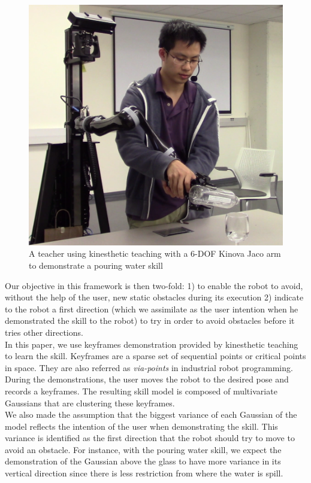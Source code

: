 \documentclass[letterpaper, 10 pt, conference]{ieeeconf}  %
\begin{document}
\begin{figure}[ht]
	\centering
	\includegraphics[scale=0.2]{figure/kinesthetic_teaching.png}
	\caption{A teacher using kinesthetic teaching with a 6-DOF Kinova Jaco arm to demonstrate a pouring water skill}
	\label{Pic_kinesthetik_teaching}
\end{figure}

Our objective in this framework is then two-fold: 1) to enable the robot to avoid, without the help of the user, new static obstacles during its execution  2) indicate to the robot a first direction (which we assimilate as the user intention when he demonstrated the skill to the robot) to try in order to avoid obstacles before it tries other directions.\\

In this paper, we use keyframes demonstration provided by kinesthetic teaching to learn the skill. Keyframes are a sparse set of sequential points or critical points in space. They are also referred as \textit{via-points} in industrial robot programming. During the demonstrations, the user moves the robot to the desired pose and records a keyframes. The resulting skill model is composed of multivariate Gaussians that are clustering these keyframes.\\
We also made the assumption that the biggest variance of each Gaussian of the model reflects the intention of the user when demonstrating the skill. This variance is identified as the first direction that the robot should try to move to avoid an obstacle. For instance, with the pouring water skill, we expect the demonstration of the Gaussian above the glass to have more variance in its vertical direction since there is less restriction from where the water is spill. 
 
\end{document}
